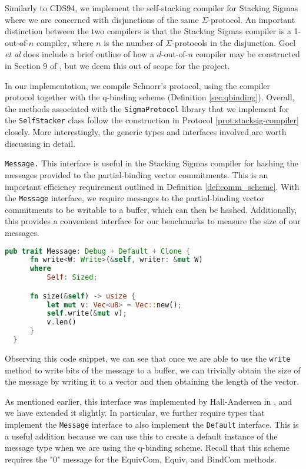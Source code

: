 Similarly to CDS94, we implement the self-stacking compiler for Stacking Sigmas where 
we are concerned with disjunctions of the same $\Sigma$-protocol. An important distinction between 
the two compilers is that the Stacking Sigmas compiler is a 1-out-of-$n$ compiler, where $n$ is the
number of $\Sigma$-protocols in the disjunction. Goel \emph{et al} does include a brief outline of 
how a $d$-out-of-$n$ compiler may be constructed in Section 9 of \cite{StackingSigmas}, but we deem 
this out of scope for the project. 

In our implementation, we compile Schnorr's protocol, using the 
compiler protocol together with the q-binding scheme (Definition \ref{sec:qbinding}).
Overall, the methods associated with the \texttt{SigmaProtocol} library that we implement for the 
\texttt{SelfStacker} class follow the construction in Protocol \ref{prot:stacksig-compiler} closely. 
More interestingly, the generic types and interfaces involved are worth discussing in detail.

\texttt{\texttt{Message}.} This interface is useful in the Stacking Sigmas compiler 
for hashing the messages provided to the partial-binding vector commitments. This is 
an important efficiency requirement outlined in Definition \ref{def:comm_scheme}. 
With the \texttt{Message} interface, we require messages to the partial-binding vector
commitments to be writable to a buffer, which can then be hashed. Additionally, this 
provides a convenient interface for our benchmarks to measure the size of our messages. 

\begin{lstlisting}[language=rust]
  pub trait Message: Debug + Default + Clone {
      fn write<W: Write>(&self, writer: &mut W)
      where
          Self: Sized;

      fn size(&self) -> usize {
          let mut v: Vec<u8> = Vec::new();
          self.write(&mut v);
          v.len()
      }
  }  
\end{lstlisting}

Observing this code snippet, we can see that once we are able to use the \texttt{write} 
method to write bits of the message to a buffer, we can trivially obtain the size of 
the message by writing it to a vector and then obtaining the length of the vector.

As mentioned earlier, this interface was implemented by Hall-Andersen in 
\cite{MHAStackSig}, and we have extended it slightly. In particular, we further require types 
that implement the \texttt{Message} interface to also implement the \texttt{Default} interface. 
This is a useful addition 
because we can use this to create a default instance of the message type when we are 
using the q-binding scheme. Recall that this scheme requires the "0" message for the 
\textsf{EquivCom}, \textsf{Equiv}, and \textsf{BindCom} methods.

